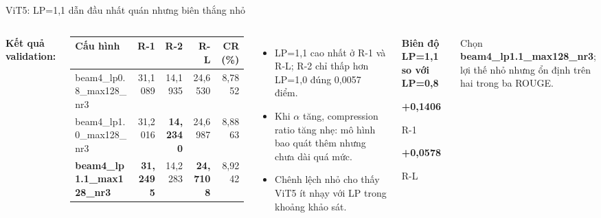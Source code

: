 \documentclass[aspectratio=169,10pt]{beamer}
\newcommand{\selectedrow}{\rowcolor{SoftYellow}}
\newcommand{\tightitems}{\setlength{\itemsep}{2.0pt}\setlength{\parskip}{0pt}}
\begin{document}
\begin{frame}{ViT5: LP=1,1 dẫn đầu nhất quán nhưng biên thắng nhỏ}
  \begin{columns}[T,onlytextwidth]
      \textbf{Kết quả validation:}
      \vspace{1mm}
      \scriptsize
      \setlength{\tabcolsep}{3.0pt}
      \begin{tabular}{lrrrr}
        \toprule
        \textbf{Cấu hình} & \textbf{R-1} & \textbf{R-2} & \textbf{R-L} & \textbf{CR (\%)}\\
        \midrule
        beam4\_lp0.8\_max128\_nr3 & 31,1089 & 14,1935 & 24,6530 & 8,7852\\
        beam4\_lp1.0\_max128\_nr3 & 31,2016 & \textbf{14,2340} & 24,6987 & 8,8863\\
        \selectedrow
        \textbf{beam4\_lp1.1\_max128\_nr3} & \textbf{31,2495} & 14,2283 & \textbf{24,7108} & 8,9242\\
        \bottomrule
      \end{tabular}
      \vspace{1.5mm}
      \begin{itemize}\footnotesize\tightitems
        \item LP=1,1 cao nhất ở R-1 và R-L; R-2 chỉ thấp hơn LP=1,0 đúng 0,0057 điểm.
        \item Khi $\alpha$ tăng, compression ratio tăng nhẹ: mô hình bao quát thêm nhưng chưa dài quá mức.
        \item Chênh lệch nhỏ cho thấy ViT5 ít nhạy với LP trong khoảng khảo sát.
      \end{itemize}
      \begin{softbox}
        \centering\scriptsize
        \textbf{Biên độ LP=1,1 so với LP=0,8}\par\vspace{1mm}
        {\color{VitPurple}\Large\bfseries +0,1406}\par R-1\par\vspace{1mm}
        {\color{VitPurple}\Large\bfseries +0,0578}\par R-L
      \end{softbox}
      \vspace{2mm}
      \begin{keymessage}
        \scriptsize Chọn \textbf{beam4\_lp1.1\_max128\_nr3}; lợi thế nhỏ nhưng ổn định trên hai trong ba ROUGE.
      \end{keymessage}
  \end{columns}
\end{frame}
\end{document}
